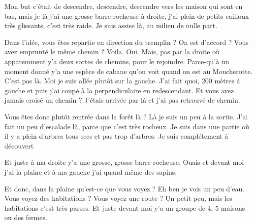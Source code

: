 \begin{dialogue}
  \Req {} Mon but c’était de descendre, descendre, descendre
  vers les maison qui sont en bas,  mais je là j’ai une
  grosse barre rocheuse à droite,  j’ai plein de petits
  cailloux très glissants,  c’est très raide.  Je
  suis assise là, au milieu de nulle part.
\end{dialogue}


\begin{dialogue}
  \Sec {} Dans l’idée, vous êtes repartie en direction du
  tremplin ? On est d’accord ? Vous avez emprunté le même chemin ?
  \Req {} Voila. Oui.  Mais, pas par la droite où
   apparemment y’a deux sortes de chemins, pour le
  rejoindre.  Parce-qu’à un moment donné y’a une espèce de
  cabane qu’on voit quand on est au Moucherotte. C’est pas
  là.  Moi je suis allée plutôt sur la gauche. J’ai fait
  quoi, 200 mètres à gauche et  puis j’ai coupé à la
  perpendiculaire en redescendant.
  \Sec {} Et vous avez jamais croisé un chemin ?
  \Req {} J’étais arrivée par là et j’ai pas retrouvé de
  chemin.
\end{dialogue}

\begin{dialogue}
  \Sec {} Vous êtes donc plutôt rentrée dans la forêt là ?
  \Req {} Là je suis un peu à la sortie.  J’ai fait
  un peu d’escalade là,  parce que c’est très
  rocheux.  Je suis dans une partie où il y a plein d’arbres
  tous secs et pas trop d’arbres. Je suis complétement à découvert
\end{dialogue}


\begin{dialogue}
  \Req {} Et juste à ma droite y’a une grosse, grosse barre
  rocheuse.  Ouais et devant moi j’ai la plaine et
   à ma gauche j’ai quand même des sapins.
\end{dialogue}


\begin{dialogue}
  \Sec {} Et donc, dans la plaine qu’est-ce que vous voyez ?
  \Req {} Eh ben je vois un peu d’eau.
  \Sec {} Vous voyez des habitations ? Vous voyez une route ?
  \Req {} Un petit peu, mais les habitations c’est très
  parses.  Et juste devant moi y’a un groupe de 4, 5 maisons
  ou des fermes.
\end{dialogue}

